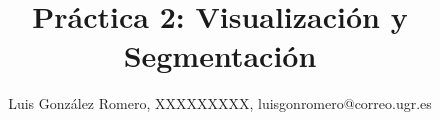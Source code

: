 \author{Luis González Romero, XXXXXXXXX, luisgonromero@correo.ugr.es}
\title{Práctica 2: Visualización y Segmentación}
\newcommand{\grupopracticas}{Grupo 1: Miércoles 17:30-19:30}
\newcommand{\subtitulo}{Subtítulo}
\newcommand{\curso}{Inteligencia de Negocio}
\newcommand{\departamento}{Computación y Sistemas Inteligentes}